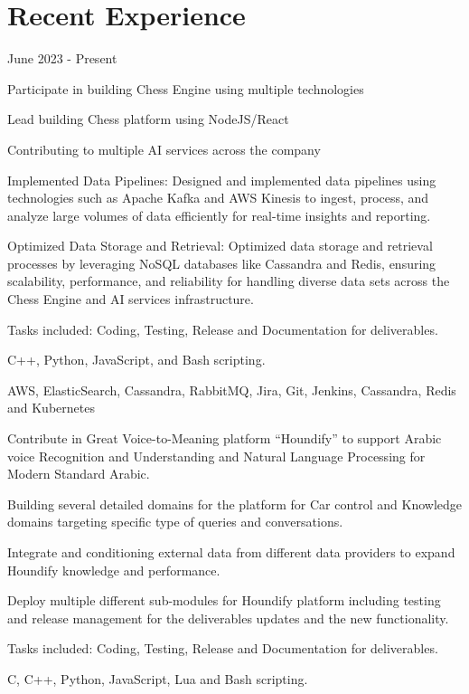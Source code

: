 \section{Recent Experience}

 {June 2023 - Present}
\begin{resume_list}
    \item Participate in building Chess Engine using multiple technologies
    \item Lead building Chess platform using NodeJS/React
    \item Contributing to multiple AI services across the company
    \item Implemented Data Pipelines: Designed and implemented data pipelines using technologies such as Apache Kafka and AWS Kinesis to ingest, process, and analyze large volumes of data efficiently for real-time insights and reporting.
    \item Optimized Data Storage and Retrieval: Optimized data storage and retrieval processes by leveraging NoSQL databases like Cassandra and Redis, ensuring scalability, performance, and reliability for handling diverse data sets across the Chess Engine and AI services infrastructure.
    \item Tasks included: Coding, Testing, Release and Documentation for deliverables.
    \item C++, Python, JavaScript, and Bash scripting.
    \item AWS, ElasticSearch, Cassandra, RabbitMQ, Jira, Git, Jenkins, Cassandra, Redis and Kubernetes
\end{resume_list}

\begin{resume_list}
    \item Contribute in Great Voice-to-Meaning platform “Houndify” to support Arabic voice Recognition and Understanding and Natural Language Processing for Modern Standard Arabic.
    \item Building several detailed domains for the platform for Car control and Knowledge domains targeting specific type of queries and conversations.
    \item Integrate and conditioning external data from different data providers to expand Houndify knowledge and performance.
    \item Deploy multiple different sub-modules for Houndify platform including testing and release management for the deliverables updates and the new functionality.
    \item Tasks included: Coding, Testing, Release and Documentation for deliverables.
    \item C, C++, Python, JavaScript, Lua and Bash scripting.
\end{resume_list}

